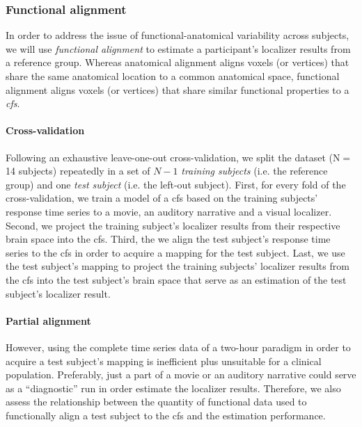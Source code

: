 \subsubsection{Functional alignment}


In order to address the issue of functional-anatomical variability across
subjects, we will use \textit{functional alignment} \citep[cf.][for
reviews]{haxby2020hyperalignment, bazeille2021empirical} to estimate a
participant's localizer results from a reference group.
%
Whereas anatomical alignment aligns voxels (or vertices) that share the same
anatomical location to a common anatomical space, functional alignment aligns
voxels (or vertices) that share similar functional properties to a
\textit{\ac{cfs}}.


\paragraph{Cross-validation}



%
Following an exhaustive leave-one-out cross-validation, we split the dataset
(N$=$14 subjects) repeatedly in a set of $N-1$ \textit{training subjects} (i.e.
the reference group) and one \textit{test subject} (i.e. the left-out subject).
%
First, for every fold of the cross-validation, we train a model of a \ac{cfs}
based on the training subjects' response time series to a movie, an auditory
narrative and a visual localizer.
%
Second, we project the training subject's localizer results from their
respective brain space into the \ac{cfs}.
%
Third, the we align the test subject's response time series to the \ac{cfs} in
order to acquire a mapping for the test subject.
%
Last, we use the test subject's mapping to project the training subjects'
localizer results from the \ac{cfs} into the test subject's brain space that
serve as an estimation of the test subject's localizer result.

\paragraph{Partial alignment}
However, using the complete time series data of a two-hour paradigm in order to
acquire a test subject's mapping is inefficient plus unsuitable for a clinical
population.
%
Preferably, just a part of a movie or an auditory narrative could serve as a
``diagnostic'' run in order estimate the localizer results.
%
Therefore, we also assess the relationship between the quantity of functional
data used to functionally align a test subject to the \ac{cfs} and the
estimation performance.


